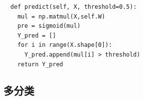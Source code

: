 \begin{lstlisting}
  def predict(self, X, threshold=0.5):
    mul = np.matmul(X,self.W)
    pre = sigmoid(mul)
    Y_pred = []
    for i in range(X.shape[0]):
      Y_pred.append(mul[i] > threshold)
    return Y_pred
\end{lstlisting}


\subsection{多分类}
















